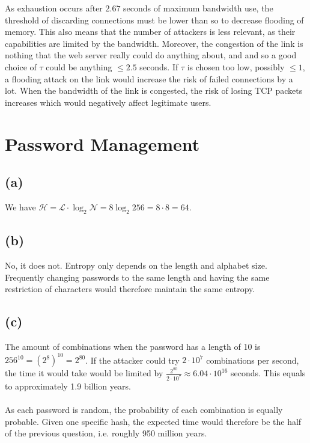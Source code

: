 \documentclass{article}
\begin{document}
As exhaustion occurs after $2.67$ seconds of maximum bandwidth use, the threshold of discarding connections must be lower than so to decrease flooding of memory. This also means that the number of attackers is less relevant, as their capabilities are limited by the bandwidth.
Moreover, the congestion of the link is nothing that the web server really could do anything about, and and so a good choice of $\tau$ could be anything $\leq 2.5$ seconds. %
If $\tau$ is chosen too low, possibly $\leq 1$, a flooding attack on the link %
would increase the risk of failed connections by a lot.
When the bandwidth of the link is congested, the risk of losing TCP packets increases which would negatively affect legitimate users.
\newpage
\section{Password Management}

\subsection*{(a)}

We have $\mathcal{H}=\mathcal{L}\cdot \log_2 \mathcal{N} = 8\log_2 256 = 8 \cdot 8 = 64$.

\subsection*{(b)}

No, it does not.
Entropy only depends on the length and alphabet size.
Frequently changing passwords to the same length and having the same restriction of characters would therefore maintain the same entropy.

\subsection*{(c)}

The amount of combinations when the password has a length of 10 is $256^{10}=(2^8)^{10}=2^{80}$.
If the attacker could try $2\cdot 10^{7}$ combinations per second, the time it would take would be limited by $\frac{2^{80}}{2 \cdot 10^7}\approx 6.04 \cdot 10^{16}$ seconds.
This equals to approximately 1.9 billion years.
\\
\\
As each password is random, the probability of each combination is equally probable.
Given one specific hash, the expected time would therefore be the half of the previous question, i.e. roughly 950 million years.
\end{document}
